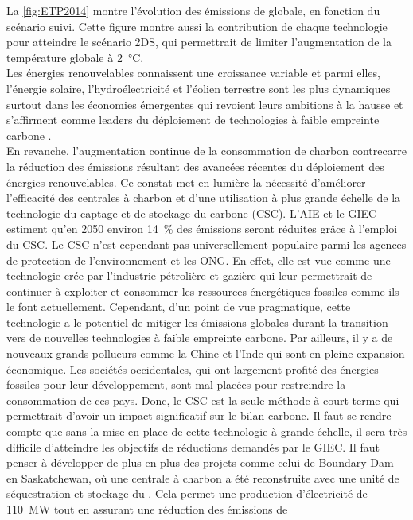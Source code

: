 La \cref{fig:ETP2014} montre l'évolution des émissions de  globale, en
fonction du scénario suivi. Cette figure montre aussi la contribution de chaque
technologie pour atteindre le scénario 2DS, qui permettrait de limiter
l'augmentation de la température globale à \SI{2}{\degreeCelsius}.\\
Les énergies renouvelables connaissent une croissance variable et parmi elles,
l'énergie solaire, l'hydroélectricité et l'éolien terrestre sont les plus
dynamiques surtout dans les économies émergentes qui revoient leurs ambitions à
la hausse et s'affirment comme leaders du déploiement de technologies à faible
empreinte carbone \citep{ETP2014}.\\
En revanche, l'augmentation continue de la consommation de charbon contrecarre
la réduction des émissions résultant des avancées récentes du déploiement des
énergies renouvelables. Ce constat met en lumière la nécessité d'améliorer
l'efficacité des centrales à charbon et d'une utilisation à plus grande échelle
de la technologie du captage et de stockage du carbone (CSC). L'AIE et le GIEC
estiment qu’en \num{2050} environ \SI{14}{\percent} des émissions seront
réduites grâce à l'emploi du CSC. Le CSC n'est cependant pas universellement
populaire parmi les agences de protection de l’environnement et les ONG. En
effet, elle est vue comme une technologie crée par l’industrie pétrolière et
gazière qui leur permettrait de continuer à exploiter et consommer les
ressources énergétiques fossiles comme ils le font actuellement. Cependant, d'un
point de vue pragmatique, cette technologie a le potentiel de mitiger les
émissions globales durant la transition vers de nouvelles technologies à faible
empreinte carbone. Par ailleurs, il y a de nouveaux grands pollueurs comme la
Chine et l'Inde qui sont en pleine expansion économique. Les sociétés
occidentales, qui ont largement profité des énergies fossiles pour leur
développement, sont mal placées pour restreindre la consommation de ces pays.
Donc, le CSC est la seule méthode à court terme qui permettrait d'avoir un
impact significatif sur le bilan carbone.
Il faut se rendre compte que sans la
mise en place de cette technologie à grande échelle, il sera très difficile
d’atteindre les objectifs de réductions demandés par le GIEC. Il faut penser à
développer de plus en plus des projets comme celui de Boundary Dam en
Saskatchewan, où une centrale à charbon a été reconstruite avec une unité de
séquestration et stockage du . Cela permet une production
d'électricité de \SI{110}{\MW} tout en assurant une réduction des émissions de
